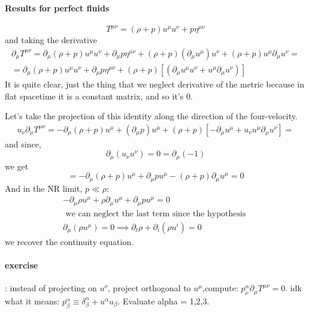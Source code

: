 \paragraph{Results for perfect fluids}
\[
T^{\mu \nu } = \left( \rho  +p \right) u^{\mu }u^{\nu }+p \eta^{\mu \nu }
\]
and taking the derivative
\begin{gather*}
\partial_{\mu } T^{\mu \nu } = \partial_{\mu }\left( \rho +p \right)u^{\mu }u^{\nu } + \partial_{\mu }p \eta^{\mu \nu } + \left( \rho +p \right)\left( \partial_{\mu }u^{\mu } \right)u^{\nu } + \left( \rho +p \right) u^{\mu }\partial_{\mu }u^{\nu } = \\
= \partial_{\mu }\left( \rho +p \right)u^{\mu }u^{\nu }+ \partial_{\mu }p \eta^{\mu \nu } + \left( \rho +p \right) [\left( \partial_{\mu }u^{\mu }u^{\nu } + u^{\mu }\partial_{\mu }u^{\nu } \right)]
\end{gather*}
It is quite clear, just the thing that we neglect derivative of the metric because in flat spacetime it is a constant matrix, and so it's 0.\par
Let's take the projection of this identity along the direction of the four-velocity.
\begin{gather*}
	u_{\nu }\partial_{\mu }T^{\mu \nu } = -\partial_{\mu }\left( \rho +p \right)u^{\mu }+\left( \partial_{\mu }p \right)u^{\mu }+\left( \rho +p \right)[-\partial_{\mu }u^{\mu }+u_{\nu }u^{\mu }\partial_{\mu }u^{\nu }] =
\end{gather*}
and since, 
\[
\partial_{\mu }\left( u_{\nu }u^{\nu } \right) = 0 = \partial_{\mu }\left( -1 \right)
\]
we get
\begin{equation}
= -\partial_{\mu }\left( \rho +p \right)u^{\mu } + \partial_{\mu }p u^{\mu }- \left( \rho +p \right)\partial_{\mu }u^{\mu } = 0
\end{equation}
And in the NR limit, $p\ll \rho $:
\begin{gather*}
-\partial_{\mu }\rho  u^{\mu }+\rho \partial_{\mu }u^{\mu }+ \partial_{\mu }pu^{\mu }=0 \\
\text{ we can neglect the last term since the hypothesis } \\
\partial_{\mu }\left( \rho u^{\mu } \right) = 0 \implies \partial_{t}\rho +\partial_{i}\left( \rho u^{i} \right) = 0
\end{gather*}
we recover the continuity equation.

\paragraph{exercise}: instead of projecting on $u^{\nu  }$, project orthogonal to $u^{\mu }$,compute: $p^{\alpha }_{\nu } \partial_{\mu }T^{\mu \nu }=0$.
idk what it means: $p^{\alpha }_{\beta }\equiv \delta^{\alpha }_{\beta } + u^{\alpha }u_{\beta }$. Evaluate alpha = 1,2,3.






